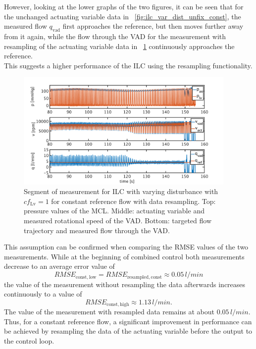 However, looking at the lower graphs of the two figures, it can be seen that for the unchanged actuating variable data in \figurename~\ref{fig:ilc_var_dist_unfix_const}, the measured flow $q_{\mathrm{vad}}$ first approaches the reference, but then moves further away from it again, while the flow through the VAD for the measurement with resampling of the actuating variable data in \figurename~\ref{fig:ilc_var_dist_fix_const} continuously approaches the reference.
\\This suggests a higher performance of the ILC using the resampling functionality.
\begin{figure}[ht!]
  \centering
  \includegraphics[width=0.95\textwidth]{images/chapt_5/ILC/ilc_var_dist_fix_const.pdf}
  \caption[Segment of measurement for ILC with varying disturbance with $cf_{\mathrm{Lv}}=1$ for constant reference flow with data resampling]{Segment of measurement for ILC with varying disturbance with $cf_{\mathrm{Lv}}=1$ for constant reference flow with data resampling. Top:  pressure values of the MCL. Middle: actuating variable and measured rotational speed of the VAD. Bottom: targeted flow trajectory and measured flow through the VAD.}
  \label{fig:ilc_var_dist_fix_const}
\end{figure}
This assumption can be confirmed when comparing the RMSE values of the two measurements.
While at the beginning of combined control both measurements decrease to an average error value of
\begin{equation}
  RMSE_{\mathrm{const,low}}=RMSE_{\mathrm{resampled,const}}\approx0.05\,l/min
\end{equation}
 the value of the measurement without resampling the data afterwards increases continuously to a value of
\begin{equation}
  RMSE_{\mathrm{const,high}}\approx1.13\,l/min.
\end{equation}
The value of the measurement with resampled data remains at about $0.05\,l/min$. Thus, for a constant reference flow, a significant improvement in performance can be achieved by resampling the data of the actuating variable before the output to the control loop.
